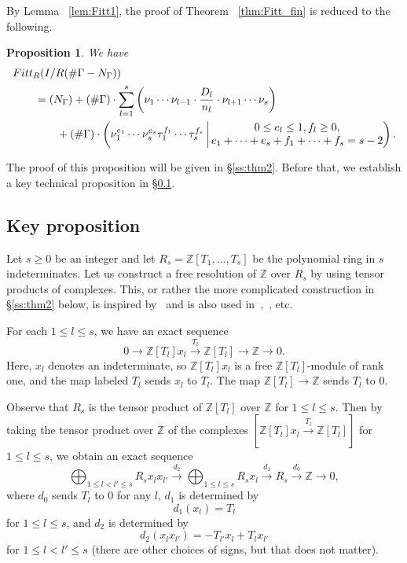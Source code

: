 \documentclass[11pt]{article}
\newtheorem{prop}[theo]{Proposition}
\theoremstyle{definition}
\numberwithin{equation}{section}
\newcommand{\Z}{\mathbb{Z}}
\newcommand{\Fitt}{{\rm Fitt}}
\begin{document}
By Lemma ~\ref{lem:Fitt1}, the proof of Theorem ~\ref{thm:Fitt_fin} is reduced to the following.

\begin{prop}\label{prop:Fitt_fin2}
We have
\begin{align}
& \Fitt_{R}(I/R(\# \Gamma - N_{\Gamma}))\\
& \qquad = 
	(N_{\Gamma})
	+ (\# \Gamma) \cdot \sum_{l=1}^s \left( \nu_1 \cdots \nu_{l-1} \cdot \frac{D_l}{n_l} \cdot \nu_{l+1} \cdots \nu_s \right) \\
& \qquad \qquad + (\# \Gamma) \cdot \left( \nu_1^{e_1} \cdots \nu_s^{e_s} \tau_1^{f_1} \cdots \tau_s^{f_s} \, \middle| \, \begin{matrix} 0 \leq e_l \leq 1, f_l \geq 0, \\ e_1 + \cdots + e_s + f_1 + \cdots + f_s = s- 2 \end{matrix} \right).
\end{align}
\end{prop}

The proof of this proposition will be given in \S\ref{ss:thm2}.
Before that, we establish a key technical proposition in \S\ref{ss:resol}.

\subsection{Key proposition}\label{ss:resol}

Let $s \geq 0$ be an integer and let $R_s = \Z[T_1, \dots, T_s]$ be the polynomial ring in $s$ indeterminates.
Let us construct a free resolution of $\Z$ over $R_s$ by using tensor products of complexes.
This, or rather the more complicated construction in \S\ref{ss:thm2} below, is inspired by~\cite{GK15} and is also used in~\cite{Kata_05},~\cite{AK21}, etc.

For each $1 \leq l \leq s$, we have an exact sequence
\[
0 \to \Z[T_l] x_l \overset{T_l}{\to} \Z[T_l] \to \Z \to 0.
\]
Here, $x_l$ denotes an indeterminate, so $\Z[T_l] x_l$ is a free $\Z[T_l]$-module of rank one, and the map labeled $T_l$ sends $x_l$ to $T_l$.
The map $\Z[T_l] \to \Z$ sends $T_l$ to $0$.

Observe that $R_s$ is the tensor product of $\Z[T_l]$ over $\Z$ for $1 \leq l \leq s$.
Then by taking the tensor product over $\Z$ of the complexes $[\Z[T_l] x_l \overset{T_l}{\to} \Z[T_l]]$ for $1 \leq l \leq s$, we obtain an exact sequence
\[
\bigoplus_{1 \leq l < l' \leq s} R_s x_l x_{l'} \overset{d_2}{\to} \bigoplus_{1 \leq l \leq s} R_s x_l \overset{d_1}{\to} R_s \overset{d_0}{\to} \Z \to 0,
\]
where $d_0$ sends $T_l$ to $0$ for any $l$, $d_1$ is determined by 
\[
d_1(x_l) = T_l
\]
for $1 \leq l \leq s$, and $d_2$ is determined by
\[
d_2(x_l x_{l'}) = - T_{l'} x_l + T_l x_{l'}
\]
for $1 \leq l < l' \leq s$ (there are other choices of signs, but that does not matter).
\end{document}
